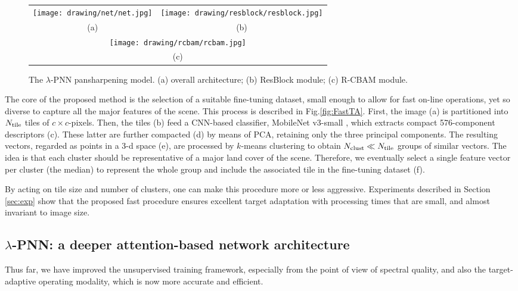 \documentclass[journal]{IEEEtran}
\begin{document}
\begin{figure*}[!h]
\centering
\newcommand\scal{0.66}
\setlength{\tabcolsep}{6mm}
\begin{tabular}{cc}
\texttt{[image: drawing/net/net.jpg]} &
\texttt{[image: drawing/resblock/resblock.jpg]} \\
(a) & (b) \\[7mm]
\multicolumn{2}{c}{\texttt{[image: drawing/rcbam/rcbam.jpg]}} \\
\multicolumn{2}{c}{(c)}
\end{tabular}
\caption{
The $\lambda$-PNN pansharpening model.
(a) overall architecture;
(b) ResBlock module;
(c) R-CBAM module.}
\label{fig:network}
\end{figure*}

The core of the proposed method is the selection of a suitable fine-tuning dataset,
small enough to allow for fast on-line operations, yet so diverse to capture all the major features of the scene.
This process is described in Fig.\ref{fig:FastTA}.
First, the image (a) is partitioned into $N_{\rm tile}$ tiles of $c{\times}c$-pixels.
Then, the tiles (b) feed a CNN-based classifier, MobileNet v3-small \cite{Howard2019}, which extracts compact 576-component descriptors (c).
These latter are further compacted (d) by means of PCA, retaining only the three principal components.
The resulting vectors, regarded as points in a 3-d space (e), are processed by $k$-means clustering
to obtain $N_{\rm clust} \ll N_{\rm tile}$ groups of similar vectors.
The idea is that each cluster should be representative of a major land cover of the scene.
Therefore, we eventually select a single feature vector per cluster (the median) to represent the whole group
and include the associated tile in the fine-tuning dataset (f).

By acting on tile size and number of clusters, one can make this procedure more or less aggressive.
Experiments described in Section \ref{sec:exp} show that the proposed fast procedure ensures excellent target adaptation
with processing times that are small, and almost invariant to image size.


\subsection{$\lambda$-PNN: a deeper attention-based network architecture}

Thus far,
we have improved the unsupervised training framework, especially from the point of view of spectral quality,
and also the target-adaptive operating modality, which is now more accurate and efficient.
\end{document}
